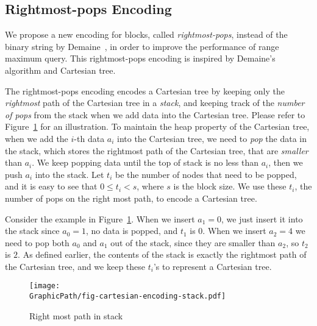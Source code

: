 
\subsection{Rightmost-pops Encoding} \label{sec:cct}

We propose a new encoding for blocks, called {\em rightmost-pops},
instead of the binary string by Demaine~\cite{Demaine2009OnCT}, in order
to improve the performance of range maximum query.  This rightmost-pops
encoding is inspired by Demaine's algorithm and Cartesian tree.

The rightmost-pops encoding encodes a Cartesian tree by keeping only
the {\em rightmost} path of the Cartesian tree in a {\em stack}, and
keeping track of the {\em number of pops} from the stack when we add
data into the Cartesian tree.  Please refer to
Figure~\ref{fig:interval-cartesian} for an illustration.  To maintain
the heap property of the Cartesian tree, when we add the $i$-th data
$a_i$ into the Cartesian tree, we need to {\em pop} the data in the
stack, which stores the rightmost path of the Cartesian tree, that are
{\em smaller} than $a_i$.  We keep popping data until the top of stack
is no less than $a_i$, then we push $a_i$ into the stack.  Let $t_i$
be the number of nodes that need to be popped, and it is easy to see
that $0 \le t_i < s$, where $s$ is the block size.  We use these
$t_i$, the number of pops on the right most path, to encode a
Cartesian tree.

Consider the example in Figure~\ref{fig:interval-cartesian}.  When we
insert $a_1 = 0$, we just insert it into the stack since $a_0 = 1$, no
data is popped, and $t_1$ is $0$.  When we insert $a_2 = 4$ we need to
pop both $a_0$ and $a_1$ out of the stack, since they are smaller than
$a_2$, so $t_2$ is $2$.  As defined earlier, the contents of the stack
is exactly the rightmost path of the Cartesian tree, and we keep these
$t_i$'s to represent a Cartesian tree.

\begin{figure}[!thb]
  \centering
  \texttt{[image: \\GraphicPath/fig-cartesian-encoding-stack.pdf]}
  \caption{Right most path in stack}
  \label{fig:interval-cartesian}
\end{figure}


